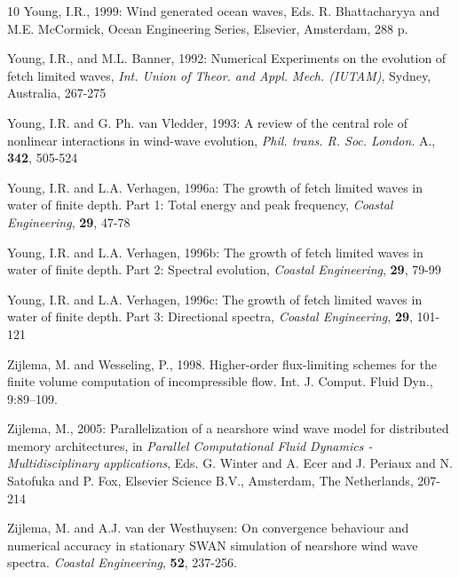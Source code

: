 \documentclass[12pt]{book}
\begin{document}
\begin{thebibliography}{10}
Young, I.R., 1999: Wind generated ocean waves, Eds. R. Bhattacharyya and M.E. McCormick, Ocean Engineering Series,
Elsevier, Amsterdam, 288 p.

Young, I.R., and M.L. Banner, 1992: Numerical Experiments on the evolution of fetch limited waves, {\it Int.
Union of Theor. and Appl. Mech. (IUTAM)}, Sydney, Australia, 267-275

Young, I.R. and G. Ph. van Vledder, 1993: A review of the central role of nonlinear interactions in wind-wave evolution,
{\it Phil. trans. R. Soc. London}. A., {\bf 342}, 505-524

Young, I.R. and L.A. Verhagen, 1996a: The growth of fetch limited waves in water of finite depth. Part 1:
Total energy and peak frequency, {\it Coastal Engineering}, {\bf 29}, 47-78

Young, I.R. and L.A. Verhagen, 1996b: The growth of fetch limited waves in water of finite depth. Part 2:
Spectral evolution, {\it Coastal Engineering}, {\bf 29}, 79-99

Young, I.R. and L.A. Verhagen, 1996c: The growth of fetch limited waves in water of finite depth. Part 3:
Directional spectra, {\it Coastal Engineering}, {\bf 29}, 101-121

Zijlema, M. and Wesseling, P., 1998. Higher-order flux-limiting schemes for the finite volume
  computation of incompressible flow. Int. J. Comput. Fluid Dyn., 9:89--109.

Zijlema, M., 2005: Parallelization of a nearshore wind wave model for distributed memory architectures,
in {\it Parallel Computational Fluid Dynamics - {M}ultidisciplinary applications},
Eds. G. Winter and A. Ecer and J. Periaux and N. Satofuka and P. Fox,
Elsevier Science B.V., Amsterdam, The Netherlands, 207-214

Zijlema, M. and A.J. van der Westhuysen: On convergence behaviour and numerical accuracy in stationary
SWAN simulation of nearshore wind wave spectra. {\it Coastal Engineering}, {\bf 52}, 237-256.

\end{thebibliography}
\end{document}

